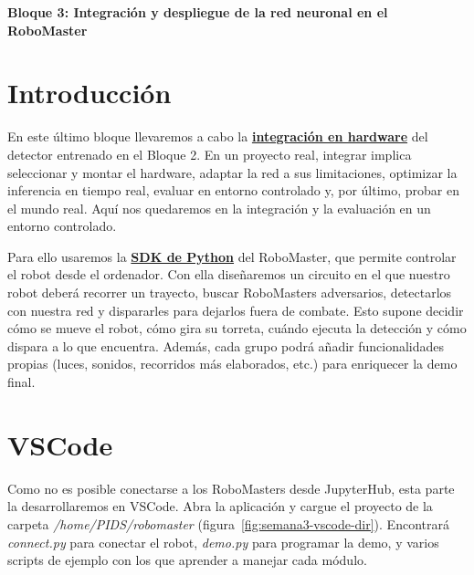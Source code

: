 \documentclass[12pt,a4paper]{article}
\begin{document}
\begin{center}
    \vspace*{.15cm}
    {\Huge \bfseries Bloque 3: Integración y despliegue de la red neuronal en el RoboMaster} \\[0.5cm]
\end{center}


\section{Introducción}
\label{sec:semana3-intro}

En este último bloque llevaremos a cabo la \underline{\textbf{integración en hardware}} del detector entrenado en el Bloque 2. En un proyecto real, integrar implica seleccionar y montar el hardware, adaptar la red a sus limitaciones, optimizar la inferencia en tiempo real, evaluar en entorno controlado y, por último, probar en el mundo real. Aquí nos quedaremos en la integración y la evaluación en un entorno controlado.

Para ello usaremos la \underline{\textbf{SDK de Python}} del RoboMaster, que permite controlar el robot desde el ordenador. Con ella diseñaremos un circuito en el que nuestro robot deberá recorrer un trayecto, buscar RoboMasters adversarios, detectarlos con nuestra red y dispararles para dejarlos fuera de combate. Esto supone decidir cómo se mueve el robot, cómo gira su torreta, cuándo ejecuta la detección y cómo dispara a lo que encuentra. Además, cada grupo podrá añadir funcionalidades propias (luces, sonidos, recorridos más elaborados, etc.) para enriquecer la demo final.


\section{VSCode}
\label{sec:semana3-vscode}

Como no es posible conectarse a los RoboMasters desde JupyterHub, esta parte la desarrollaremos en VSCode. Abra la aplicación y cargue el proyecto de la carpeta \textit{/home/PIDS/robomaster} (figura~\ref{fig:semana3-vscode-dir}). Encontrará \textit{connect.py} para conectar el robot, \textit{demo.py} para programar la demo, y varios scripts de ejemplo con los que aprender a manejar cada módulo.
\end{document}
